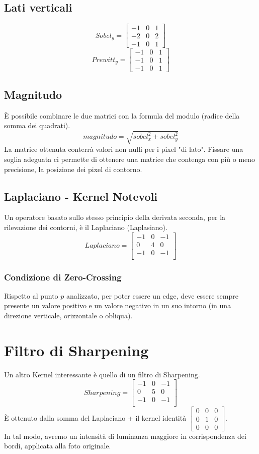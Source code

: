 \documentclass{report}
\begin{document}
	\subsection{Lati verticali}
	$$
	Sobel_y = 
	\begin{bmatrix}
		-1 & 0 & 1 \\
		-2 & 0 & 2 \\
		-1 & 0 & 1 
	\end{bmatrix}
	$$
	$$
	Prewitt_y = 
	\begin{bmatrix}
		-1 & 0 & 1 \\
		-1 & 0 & 1 \\
		-1 & 0 & 1 
	\end{bmatrix}
	$$
	\subsection{Magnitudo}
	È possibile combinare le due matrici con la formula del modulo (radice della somma dei quadrati).
	$$
	magnitudo = \sqrt{sobel_x^2 + sobel_y^2}
	$$
	La matrice ottenuta conterrà valori non nulli per i pixel "di lato". Fissare una soglia adeguata ci permette di ottenere una matrice che contenga con più o meno precisione, la posizione dei pixel di contorno.
	\subsection{Laplaciano - Kernel Notevoli}
	Un operatore basato sullo stesso principio della derivata seconda, per la rilevazione dei contorni, è il Laplaciano (Laplasiano).
	$$
	Laplaciano = \begin{bmatrix}
	-1 & 0 & -1\\
	0 & 4 & 0\\
	-1 & 0 & -1\\
	\end{bmatrix}
	$$
	\subsubsection{Condizione di Zero-Crossing}
	Rispetto al punto $p$ analizzato, per poter essere un edge, deve essere sempre presente un valore positivo e un valore negativo in un suo intorno (in una direzione verticale, orizzontale o obliqua).
	
	\section{Filtro di Sharpening}
	Un altro Kernel interessante è quello di un filtro di Sharpening.
	$$
	Sharpening = \begin{bmatrix}
	-1 & 0 & -1\\
	0 & 5 & 0\\
	-1 & 0 & -1\\
	\end{bmatrix}
	$$
	È ottenuto dalla somma del Laplaciano + il kernel identità $\begin{bmatrix}
	0 & 0 & 0\\
	0 & 1 & 0\\
	0 & 0 & 0
	\end{bmatrix}$.\\
	In tal modo, avremo un intensità di luminanza maggiore in corrispondenza dei bordi, applicata alla foto originale. 
	
\end{document}
